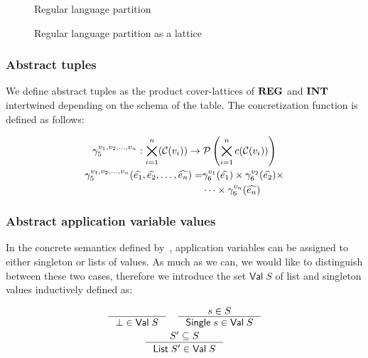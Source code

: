 \begin{figure}
    \center
    
    \caption{Regular language partition}
    \label{fig:tikz-reg-partition}
\end{figure}

\begin{figure}[!htb]
    \center
    
    \caption{Regular language partition as a lattice}
    \label{fig:tikz-reg-partition-lattice}
\end{figure}

\subsubsection{Abstract tuples}\label{subsubsec:abstract-tuples}

We define abstract tuples as the product cover-lattices of $\mathbf{REG}$ and $\mathbf{INT}$ intertwined depending on the schema of the table.
The concretization function is defined as follows:


\begin{gather}
    \gamma^{v_1, v_2, \dots, v_n}_5 : \bigtimes_{i = 1}^{n}(\mathcal{C}(v_i)) \rightarrow \mathcal{P}\left(\bigtimes_{i = 1}^n c(\mathcal{C}(v_i)) \right)\\
    \begin{split}
        \gamma^{v_1, v_2, \dots, v_n}_5(\widehat{e_1}, \widehat{e_2}, \dots, \widehat{e_n}) = &\gamma^{v_1}_6(\widehat{e_1}) \times \gamma^{v_2}_6(\widehat{e_2}) \times\\
        &\dots \times \gamma^{v_n}_6(\widehat{e_n})
    \end{split}
\end{gather}

\subsubsection{Abstract application variable values}
In the concrete semantics defined by~\cite{halder_abstract_2012}, application variables can be assigned to either singleton or lists of values.
As much as we can, we would like to distinguish between these two cases, therefore we introduce the set $\mathsf{Val} \; S$ of list and singleton values inductively defined as:


\begin{gather*}
    \inference{}{\bot \in \mathsf{Val} \; S} \quad
    \inference{s \in S}{\mathsf{Single} \; s \in \mathsf{Val} \; S}\\
    \inference{S' \subseteq S}{\mathsf{List} \; S' \in \mathsf{Val} \; S}
\end{gather*}


